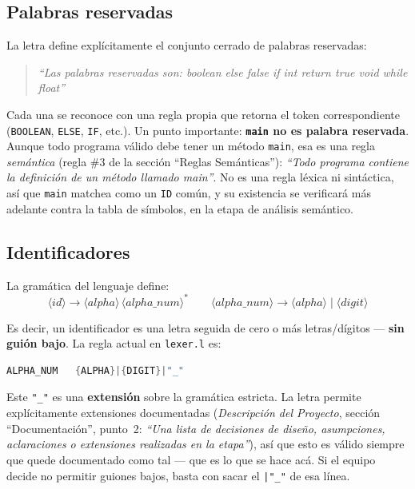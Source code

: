 \documentclass[11pt,a4paper]{article}
\begin{document}
\subsection{Palabras reservadas}

La letra define expl\'icitamente el conjunto cerrado de palabras
reservadas:

\begin{quote}
\emph{``Las palabras reservadas son: boolean else false if int return
true void while float''}
\end{quote}

Cada una se reconoce con una regla propia que retorna el token
correspondiente (\texttt{BOOLEAN}, \texttt{ELSE}, \texttt{IF}, etc.).
Un punto importante: \textbf{\texttt{main} no es palabra reservada}.
Aunque todo programa v\'alido debe tener un m\'etodo \texttt{main}, esa
es una regla \emph{sem\'antica} (regla \#3 de la secci\'on ``Reglas
Sem\'anticas''): \emph{``Todo programa contiene la definici\'on de un
m\'etodo llamado main''}. No es una regla l\'exica ni sint\'actica, as\'i que
\texttt{main} matchea como un \texttt{ID} com\'un, y su existencia se
verificar\'a m\'as adelante contra la tabla de s\'imbolos, en la etapa de
an\'alisis sem\'antico.

\subsection{Identificadores}

La gram\'atica del lenguaje define:
\[
\langle id \rangle \rightarrow \langle alpha \rangle\, \langle alpha\_num \rangle^{*}
\qquad
\langle alpha\_num \rangle \rightarrow \langle alpha \rangle \mid \langle digit \rangle
\]

Es decir, un identificador es una letra seguida de cero o m\'as
letras/d\'igitos --- \textbf{sin gui\'on bajo}. La regla actual en
\texttt{lexer.l} es:

\begin{lstlisting}[language=C]
ALPHA_NUM   {ALPHA}|{DIGIT}|"_"
\end{lstlisting}

Este \texttt{"\_"} es una \textbf{extensi\'on} sobre la gram\'atica
estricta. La letra permite expl\'icitamente extensiones documentadas
(\emph{Descripci\'on del Proyecto}, secci\'on ``Documentaci\'on'', punto~2:
\emph{``Una lista de decisiones de dise\~no, asumpciones, aclaraciones o
extensiones realizadas en la etapa''}), as\'i que esto es v\'alido siempre
que quede documentado como tal --- que es lo que se hace ac\'a. Si el
equipo decide no permitir guiones bajos, basta con sacar el
\texttt{|"\_"} de esa l\'inea.
\end{document}
